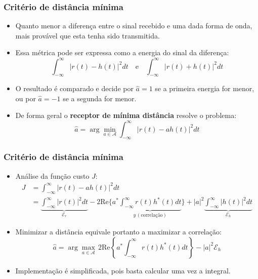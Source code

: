 \begin{frame}
	\frametitle{Critério de distância mínima}

	\begin{itemize}
	    \item Quanto menor a diferença entre o sinal recebido e uma dada forma de onda, mais provável que esta tenha sido transmitida.
	    \item Essa métrica pode ser expressa como a energia do sinal da diferença:
	    \begin{equation*}
		\int_{-\infty}^{\infty} |r(t) -h(t)|^2 dt \quad \text{e} \quad \int_{-\infty}^{\infty} |r(t) +h(t)|^2 dt
	    \end{equation*}
	    \item O resultado é comparado e decide por $\hat{a}=1$ se a primeira energia for menor, ou por  $\hat{a}=-1$ se a segunda for menor.
	    \item De forma geral o \textbf{receptor de mínima distância} resolve o problema:
	    \begin{equation*}
		\hat{a} = \arg\min_{a\in \mathcal{A}} \int_{-\infty}^{\infty} |r(t) - ah(t)|^2 dt
	    \end{equation*}

	\end{itemize}			
\end{frame}

\begin{frame}
	\frametitle{Critério de distância mínima}

	\begin{itemize}
	    \item Análise da função custo $J$:
	    \begin{align*}
		J &= \int_{-\infty}^{\infty} |r(t) - ah(t)|^2 dt \\ &= \underbrace{\int_{-\infty}^{\infty} |r(t)|^2 dt}_{\mathcal{E}_r} - 2\mathrm{Re}\biggl\{ a^* \underbrace{\int_{-\infty}^{\infty} r(t)h^*(t) dt}_{y \, (\text{correlação})} \biggr\} + |a|^2 \underbrace{\int_{-\infty}^{\infty} |h(t)|^2 dt}_{\mathcal{E}_h}
	    \end{align*}
	    \item Minimizar a distância equivale portanto a maximizar a correlação:
	    \begin{equation*}
		\hat{a} = \arg\max_{a\in \mathcal{A}} \, 2\mathrm{Re}\left\{ a^* \int_{-\infty}^{\infty} r(t) h^*(t) dt \right\} - |a|^2 \mathcal{E}_h
	    \end{equation*}
	    \item Implementação é simplificada, pois basta calcular uma vez a integral.
	\end{itemize}			
\end{frame}

